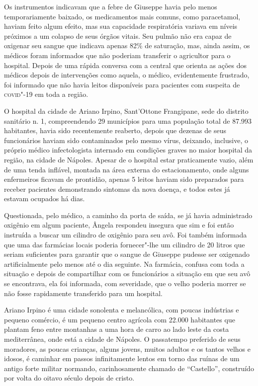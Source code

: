 Os instrumentos indicavam que a febre de Giuseppe havia pelo menos
temporariamente baixado, os medicamentos mais comuns, como paracetamol,
haviam feito algum efeito, mas sua capacidade respiratória variava em
níveis próximos a um colapso de seus órgãos vitais. Seu pulmão não era
capaz de oxigenar seu sangue que indicava apenas 82\% de saturação, mas,
ainda assim, os médicos foram informados que não poderiam transferir o
agricultor para o hospital. Depois de uma rápida conversa com a central
que orienta as ações dos médicos depois de intervenções como aquela, o
médico, evidentemente frustrado, foi informado que não havia leitos
disponíveis para pacientes com suspeita de \textsc{covid}"-19 em toda a região.

O hospital da cidade de Ariano Irpino, Sant'Ottone Frangipane, sede do
distrito sanitário n. 1, compreendendo 29 municípios para uma população
total de 87.993 habitantes, havia sido recentemente reaberto, depois que
dezenas de seus funcionários haviam sido contaminados pelo mesmo vírus,
deixando, inclusive, o próprio médico infectologista internado em
condições graves no maior hospital da região, na cidade de Nápoles.
Apesar de o hospital estar praticamente vazio, além de uma tenda
inflável, montada na área externa do estacionamento, onde alguns
enfermeiros ficavam de prontidão, apenas 5 leitos haviam sido preparados
para receber pacientes demonstrando sintomas da nova doença, e todos
estes já estavam ocupados há dias.

Questionada, pelo médico, a caminho da porta de saída, se já havia
administrado oxigênio em algum paciente, Ângela respondeu insegura que
sim e foi então instruída a buscar um cilindro de oxigênio para seu avô.
Foi também informada que uma das farmácias locais poderia fornecer"-lhe
um cilindro de 20 litros que seriam suficientes para garantir que o
sangue de Giuseppe pudesse ser oxigenado artificialmente pelo menos até
o dia seguinte. Na farmácia, confusa com toda a situação e depois de
compartilhar com os funcionários a situação em que seu avô se
encontrava, ela foi informada, com severidade, que o velho poderia
morrer se não fosse rapidamente transferido para um hospital.

Ariano Irpino é uma cidade sonolenta e melancólica, com poucas
indústrias e pequeno comércio, é um pequeno centro agrícola com 22.000
habitantes que plantam feno entre montanhas a uma hora de carro ao lado
leste da costa mediterrânea, onde está a cidade de Nápoles. O passatempo
preferido de seus moradores, as poucas crianças, alguns jovens, muitos
adultos e os tantos velhos e idosos, é caminhar em passos infinitamente
lentos em torno das ruínas de um antigo forte militar normando,
carinhosamente chamado de ``Castello'', construído por volta do oitavo
século depois de cristo.


